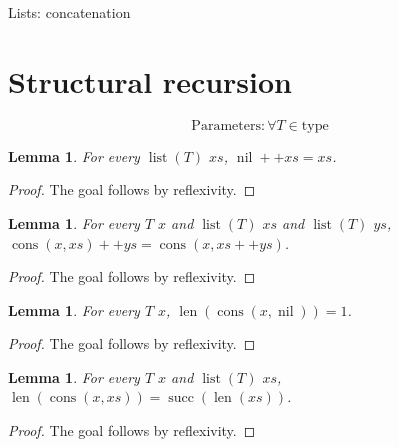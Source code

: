 \documentclass[11pt]{article}
\newtheorem{lemma}[theorem]{Lemma}
\theoremstyle{definition}
\begin{document}
\begin{center}
{\LARGE Lists: concatenation}
\end{center}
\section{Structural recursion}
\label{ll:main:recursion}
\[\mathrm{Parameters}: \forall T \in \text{type}\]
\begin{lemma}
\label{ll:main:nil-append}
For every \(\operatorname{list}(T)\) \(xs\), \(\operatorname{nil} ++ xs = xs\).
\end{lemma}
\begin{proof}
The goal follows by reflexivity.
\end{proof}
\begin{lemma}
\label{ll:main:cons-append}
For every \(T\) \(x\) and \(\operatorname{list}(T)\) \(xs\) and \(\operatorname{list}(T)\) \(ys\), \(\operatorname{cons}(x, xs) ++ ys = \operatorname{cons}(x, xs ++ ys)\).
\end{lemma}
\begin{proof}
The goal follows by reflexivity.
\end{proof}
\begin{lemma}
\label{ll:main:length-singleton}
For every \(T\) \(x\), \(\operatorname{len}(\operatorname{cons}(x, \operatorname{nil})) = 1\).
\end{lemma}
\begin{proof}
The goal follows by reflexivity.
\end{proof}
\begin{lemma}
\label{ll:main:length-cons}
For every \(T\) \(x\) and \(\operatorname{list}(T)\) \(xs\), \(\operatorname{len}(\operatorname{cons}(x, xs)) = \operatorname{succ}(\operatorname{len}(xs))\).
\end{lemma}
\begin{proof}
The goal follows by reflexivity.
\end{proof}
\end{document}
